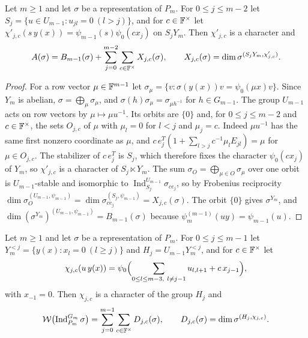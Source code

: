 \begin{lemma}\label{w39:orbits}
Let $m\ge1$ and let $\sigma$ be a representation of $P_m$. For $0\le j\le m-2$ let $S_j=\{u\in U_{m-1}:u_{jl}=0\ (l>j)\}$, and for $c\in\mathbb F^\times$ let $\chi'_{j,c}(s\,y(x))=\psi_{m-1}(s)\psi_0(cx_j)$ on $S_jY_m$. Then $\chi'_{j,c}$ is a character and
\[
A(\sigma)=B_{m-1}(\sigma)+\sum_{j=0}^{m-2}\sum_{c\in\mathbb F^\times}X_{j,c}(\sigma),\qquad X_{j,c}(\sigma)=\dim\sigma^{(S_jY_m,\chi'_{j,c})}.
\]
\end{lemma}

\begin{proof}
For a row vector $\mu\in\mathbb F^{m-1}$ let $\sigma_\mu=\{v:\sigma(y(x))v=\psi_0(\mu x)v\}$. Since $Y_m$ is abelian, $\sigma=\bigoplus_\mu\sigma_\mu$, and $\sigma(h)\sigma_\mu=\sigma_{\mu h^{-1}}$ for $h\in G_{m-1}$. The group $U_{m-1}$ acts on row vectors by $\mu\mapsto\mu u^{-1}$. Its orbits are $\{0\}$ and, for $0\le j\le m-2$ and $c\in\mathbb F^\times$, the sets $O_{j,c}$ of $\mu$ with $\mu_l=0$ for $l<j$ and $\mu_j=c$. Indeed $\mu u^{-1}$ has the same first nonzero coordinate as $\mu$, and $c\,e_j^{T}(1+\sum_{l>j}c^{-1}\mu_lE_{jl})=\mu$ for $\mu\in O_{j,c}$. The stabilizer of $c\,e_j^T$ is $S_j$, which therefore fixes the character $\psi_0(cx_j)$ of $Y_m$, so $\chi'_{j,c}$ is a character of $S_j\ltimes Y_m$. The sum $\sigma_{O}=\bigoplus_{\mu\in O}\sigma_\mu$ over one orbit is $U_{m-1}$-stable and isomorphic to $\operatorname{Ind}_{S_j}^{U_{m-1}}\sigma_{ce_j}$, so by Frobenius reciprocity $\dim\sigma_O^{(U_{m-1},\psi_{m-1})}=\dim\sigma_{ce_j}^{(S_j,\psi_{m-1})}=X_{j,c}(\sigma)$. The orbit $\{0\}$ gives $\sigma^{Y_m}$, and $\dim(\sigma^{Y_m})^{(U_{m-1},\psi_{m-1})}=B_{m-1}(\sigma)$ because $\psi^{(m-1)}_m(uy)=\psi_{m-1}(u)$.
\end{proof}

\begin{lemma}\label{w39:indP}
Let $m\ge1$ and let $\sigma$ be a representation of $P_m$. For $0\le j\le m-1$ let $Y_m^{<j}=\{y(x):x_l=0\ (l\ge j)\}$ and $H_j=U_{m-1}Y_m^{<j}$, and for $c\in\mathbb F^\times$ let
\[
\chi_{j,c}(u\,y(x))=\psi_0\Bigl(\sum_{0\le l\le m-3,\ l\ne j-1}u_{l,l+1}+c\,x_{j-1}\Bigr),
\]
with $x_{-1}=0$. Then $\chi_{j,c}$ is a character of the group $H_j$ and
\[
\mathcal W\bigl(\operatorname{Ind}_{P_m}^{G_m}\sigma\bigr)=\sum_{j=0}^{m-1}\sum_{c\in\mathbb F^\times}D_{j,c}(\sigma),\qquad D_{j,c}(\sigma)=\dim\sigma^{(H_j,\chi_{j,c})}.
\]
\end{lemma}

